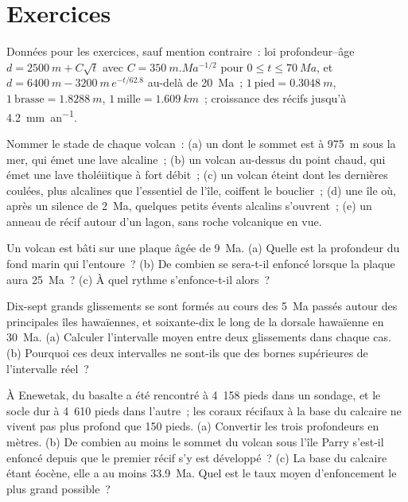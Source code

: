 \section*{Exercices}\label{sec:b2:oceanic-islands:exercises}

Données pour les exercices, sauf mention contraire~: loi profondeur--âge $d = \qty{2500}{m} + C\sqrt t$ avec
$C = \qty{350}{m.Ma^{-1/2}}$ pour $0 \le t \le \qty{70}{Ma}$, et $d = \qty{6400}{m} -
\qty{3200}{m}\,e^{-t/62.8}$ au-delà de \qty{20}{Ma}~; $1~\text{pied} = \qty{0.3048}{m}$, $1~\text{brasse}
= \qty{1.8288}{m}$, $1~\text{mille} = \qty{1.609}{km}$~; croissance des récifs jusqu'à \qty{4.2}{mm.an^{-1}}.

\begin{exercise}[$\star$]\label{exo:b2:oceanic-islands:1}
Nommer le stade de chaque volcan~: (a) un  dont le sommet est à \qty{975}{m} sous la
mer, qui émet une lave alcaline~; (b) un volcan au-dessus du point chaud, qui émet une lave tholéiitique
à fort débit~; (c) un volcan éteint dont les dernières coulées, plus alcalines que l'essentiel
de l'île, coiffent le bouclier~; (d) une île où, après un silence de \qty{2}{Ma}, quelques petits
évents alcalins s'ouvrent~; (e) un anneau de récif autour d'un lagon, sans roche volcanique en vue.
\end{exercise}

\begin{exercise}[$\star$]\label{exo:b2:oceanic-islands:2}
Un volcan est bâti sur une plaque âgée de \qty{9}{Ma}. (a) Quelle est la profondeur du fond marin qui l'entoure~?
(b) De combien se sera-t-il enfoncé lorsque la plaque aura \qty{25}{Ma}~? (c) À quel rythme s'enfonce-t-il alors~?
\end{exercise}

\begin{exercise}[$\star$]\label{exo:b2:oceanic-islands:3}
Dix-sept grands glissements se sont formés au cours des \qty{5}{Ma} passés autour des principales îles hawaïennes, et
soixante-dix le long de la dorsale hawaïenne en \qty{30}{Ma}. (a) Calculer l'intervalle moyen entre deux glissements
dans chaque cas. (b) Pourquoi ces deux intervalles ne sont-ils que des bornes supérieures de l'intervalle réel~?
\end{exercise}

\begin{exercise}[$\star$]\label{exo:b2:oceanic-islands:4}
À Enewetak, du basalte a été rencontré à 4~158 pieds dans un sondage, et le socle dur à 4~610 pieds
dans l'autre~; les coraux récifaux à la base du calcaire ne vivent pas plus profond que 150 pieds.
(a) Convertir les trois profondeurs en mètres. (b) De combien au moins le sommet du volcan sous l'île
Parry s'est-il enfoncé depuis que le premier récif s'y est développé~? (c) La base du calcaire étant
éocène, elle a au moins \qty{33.9}{Ma}. Quel est le taux moyen d'enfoncement le plus grand possible~?
\end{exercise}

